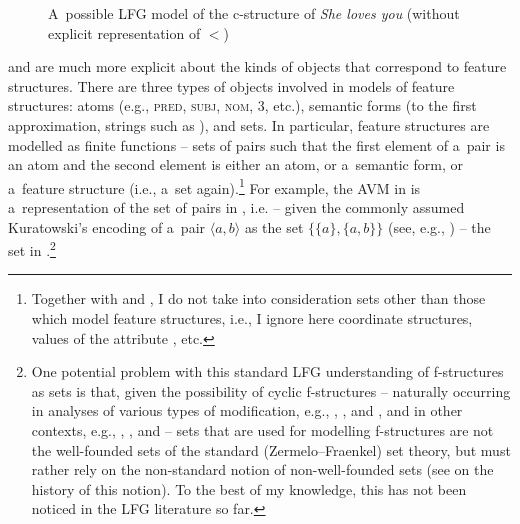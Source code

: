 \documentclass[output=paper,hidelinks]{langscibook}
\begin{document}
\begin{figure}
{}
  \caption{A~possible LFG model of the c-structure of \emph{She loves you} (without explicit representation of $<$)}
\label{fig:model:c}
\end{figure}


\citet{kaplanbresnan82} and \citet{kaplan1995formal} are much more explicit about the kinds of objects that correspond to feature structures.  There are three types of objects involved in models of feature structures: atoms (e.g., \textsc{pred}, \textsc{subj}, \textsc{nom}, \textsc{3}, etc.), semantic forms (to the first approximation, strings such as \mbox{}), and sets.  In particular, feature structures are modelled as finite functions -- sets of pairs such that the first element of a~pair is an atom and the second element is either an atom, or a~semantic form, or a~feature structure (i.e., a~set again).\footnote{Together with \citet{kaplanbresnan82} and \citet{kaplan1995formal}, I do not take into consideration sets other than those which model feature structures, i.e., I ignore here coordinate structures, values of the attribute , etc.}  For example, the AVM in  is a~representation of the set of pairs in , i.e. -- given the commonly assumed Kuratowski's encoding of a~pair $\langle a, b\rangle$ as the set $\{\{a\}, \{a,b\}\}$ (see, e.g., \citealt[36]{ende:77}) -- the set in .\footnote{One potential problem with this standard LFG understanding of f-structures as sets is that, given the possibility of cyclic f-structures -- naturally occurring in analyses of various types of modification, e.g., \citet[19--20]{john:88:book}, \citet{zwei:88}, and \citet[298]{hau:nik:12}, and in other contexts, e.g., \citet[209]{fangsells07}, \citet[Section {4.3.2}]{prz:pat:12b}, and \citet{dal:pat:zym:20} -- sets that are used for modelling f-structures are not the well-founded sets of the standard (Zermelo--Fraenkel) set theory, but must rather rely on the non-standard notion of non-well-founded sets (see \citealt[103--112]{acze:88} on the history of this notion).  To the best of my knowledge, this has not been noticed in the LFG literature so far.}
\end{document}
